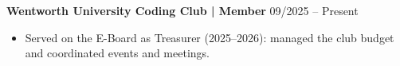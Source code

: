 \noindent
\textbf{Wentworth University Coding Club | Member} \hfill 09/2025 -- Present
\begin{itemize}
    \item Served on the E-Board as Treasurer (2025--2026): managed the club budget and coordinated events and meetings.
\end{itemize}
